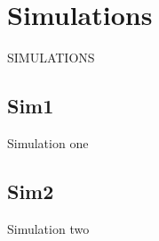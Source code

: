 \section{Simulations}

SIMULATIONS

\subsection{Sim1}

Simulation one

\subsection{Sim2}

Simulation two